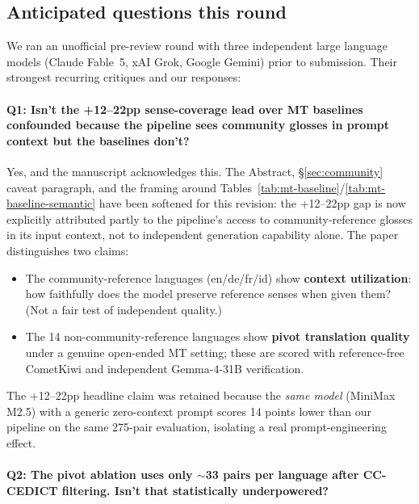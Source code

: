 \documentclass[11pt]{article}
\begin{document}
\subsection{Anticipated questions this round}
\label{sec:response-anticipated}

We ran an unofficial pre-review round with three independent large language models (Claude Fable~5, xAI Grok, Google Gemini) prior to submission. Their strongest recurring critiques and our responses:

\paragraph{Q1: Isn't the +12--22pp sense-coverage lead over MT baselines confounded because the pipeline sees community glosses in prompt context but the baselines don't?}

Yes, and the manuscript acknowledges this. The Abstract, \S\ref{sec:community} caveat paragraph, and the framing around Tables~\ref{tab:mt-baseline}/\ref{tab:mt-baseline-semantic} have been softened for this revision: the +12--22pp gap is now explicitly attributed partly to the pipeline's access to community-reference glosses in its input context, not to independent generation capability alone. The paper distinguishes two claims:

\begin{itemize}
\item The community-reference languages (en/de/fr/id) show \textbf{context utilization}: how faithfully does the model preserve reference senses when given them? (Not a fair test of independent quality.)
\item The 14 non-community-reference languages show \textbf{pivot translation quality} under a genuine open-ended MT setting; these are scored with reference-free CometKiwi and independent Gemma-4-31B verification.
\end{itemize}

The +12--22pp headline claim was retained because the \emph{same model} (MiniMax M2.5) with a generic zero-context prompt scores 14 points lower than our pipeline on the same 275-pair evaluation, isolating a real prompt-engineering effect.

\paragraph{Q2: The pivot ablation uses only $\sim$33 pairs per language after CC-CEDICT filtering. Isn't that statistically underpowered?}
\end{document}

